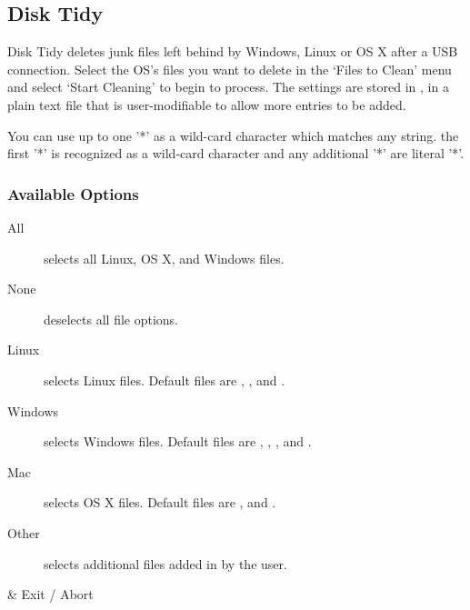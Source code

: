 \subsection{Disk Tidy}
  Disk Tidy deletes junk files left behind by Windows, Linux or OS X after a USB
  connection. Select the OS's files you want to delete in the `Files to Clean'
  menu and select `Start Cleaning' to begin to process. The settings
  are stored in , in a plain text
  file that is user-modifiable to allow more entries to be added.
  
  You can use up to one '*' as a wild-card character which matches any string.
  the first '*' is recognized as a wild-card character and any additional '*' are 
  literal '*'.
  

  \subsubsection{Available Options}
  \begin{description}
    \item[All] selects all Linux, OS X, and Windows files.
    \item[None] deselects all file options.
    \item[Linux] selects Linux files. Default files are
      , , and .
    \item[Windows] selects Windows files. Default files are
      , , ,  and
      .
    \item[Mac] selects OS X files. Default files are ,  and
      .
    \item[Other] selects additional files added in by the user.
  \end{description}
  
  \begin{btnmap}
      \ActionStdCancel
      & Exit / Abort\\
  \end{btnmap}
